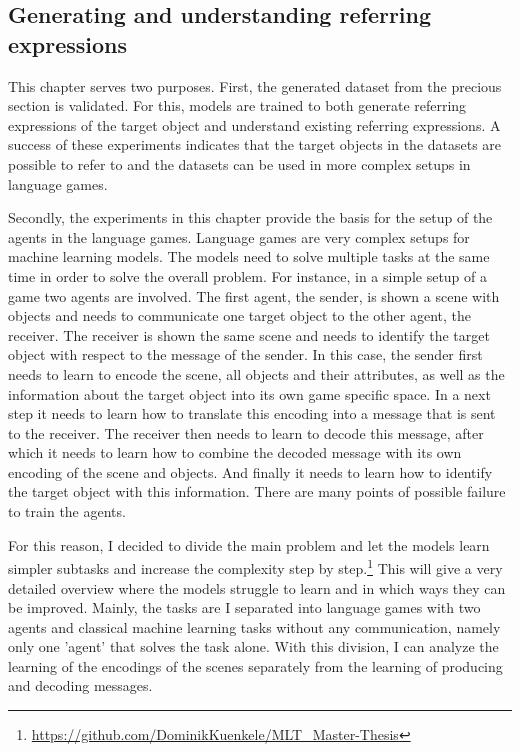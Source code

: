 
\subsection{Generating and understanding referring expressions}
\label{sec:preexperiments}
This chapter serves two purposes.
First, the generated dataset from the precious section is validated.
For this, models are trained to both generate referring expressions of the target object and understand existing referring expressions.
A success of these experiments indicates that the target objects in the datasets are possible to refer to and the datasets can be used in more complex setups in language games.

Secondly, the experiments in this chapter provide the basis for the setup of the agents in the language games.
Language games are very complex setups for machine learning models.
The models need to solve multiple tasks at the same time in order to solve the overall problem.
For instance, in a simple setup of a game two agents are involved.
The first agent, the sender, is shown a scene with objects and needs to communicate one target object to the other agent, the receiver.
The receiver is shown the same scene and needs to identify the target object with respect to the message of the sender.
In this case, the sender first needs to learn to encode the scene, all objects and their attributes, as well as the information about the target object into its own game specific space.
In a next step it needs to learn how to translate this encoding into a message that is sent to the receiver.
The receiver then needs to learn to decode this message, after which it needs to learn how to combine the decoded message with its own encoding of the scene and objects.
And finally it needs to learn how to identify the target object with this information.
There are many points of possible failure to train the agents.

For this reason, I decided to divide the main problem and let the models learn simpler subtasks and increase the complexity step by step.\footnote{\href{https://github.com/DominikKuenkele/MLT\_Master-Thesis}{https://github.com/DominikKuenkele/MLT\_Master-Thesis}}
This will give a very detailed overview where the models struggle to learn and in which ways they can be improved.
Mainly, the tasks are I separated into language games with two agents and classical machine learning tasks without any communication, namely only one 'agent' that solves the task alone.
With this division, I can analyze the learning of the encodings of the scenes separately from the learning of producing and decoding messages.

